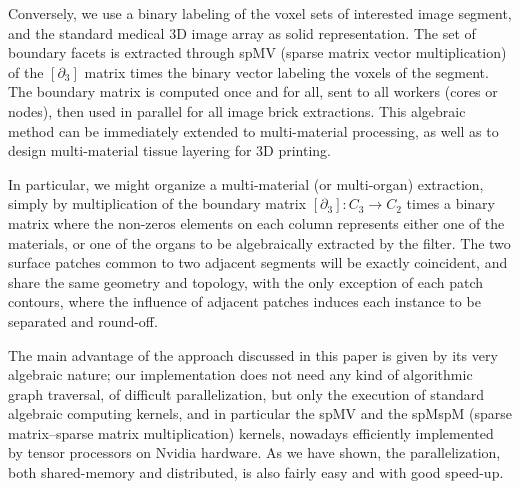 Conversely, we use a binary labeling of the voxel sets of interested image segment, and the standard medical 3D image array as solid representation. The set of boundary facets is extracted through spMV (sparse matrix vector multiplication) of the $[\partial_3]$ matrix times the binary vector labeling the voxels of the segment. The boundary matrix is computed once and for all, sent to all workers (cores or nodes), then used in parallel for all image brick extractions. This algebraic method can be immediately extended to multi-material processing, as well as to design multi-material tissue layering for 3D printing.

In particular, we might organize a multi-material (or multi-organ) extraction, simply by multiplication of the boundary matrix $[\partial_3]: C_3\to C_2$  times a binary matrix where the non-zeros elements on each column represents either one of the materials, or one of the organs to be algebraically extracted by the filter. The two surface patches common to two adjacent segments will be exactly coincident, and share the same geometry and topology, with the only exception of each patch contours, where the influence of adjacent patches induces each instance to be separated and round-off.
%

The main advantage of the approach discussed in this paper is given by its very algebraic nature; our implementation does not need any kind of algorithmic graph traversal, of difficult parallelization, but only the execution of standard algebraic computing kernels, and in particular the spMV and the spMspM (sparse matrix--sparse matrix multiplication) kernels, nowadays efficiently implemented by tensor processors on Nvidia hardware.  As we have shown, the parallelization, both shared-memory and distributed, is also fairly easy and with good speed-up.



